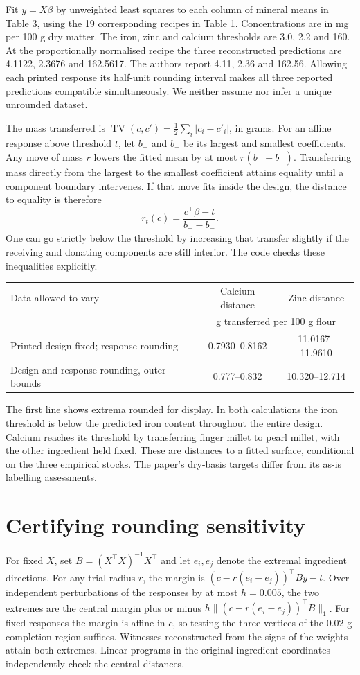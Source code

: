\documentclass[11pt]{article}
\newcommand{\TV}{\operatorname{TV}}
\begin{document}
Fit $y=X\beta$ by unweighted least squares to each column of mineral means in Table 3, using the 19 corresponding recipes in Table 1. Concentrations are in mg per 100 g dry matter. The iron, zinc and calcium thresholds are 3.0, 2.2 and 160. At the proportionally normalised recipe the three reconstructed predictions are 4.1122, 2.3676 and 162.5617. The authors report 4.11, 2.36 and 162.56. Allowing each printed response its half-unit rounding interval makes all three reported predictions compatible simultaneously. We neither assume nor infer a unique unrounded dataset.

The mass transferred is $\TV(c,c')=\tfrac12\sum_i |c_i-c'_i|$, in grams. For an affine response above threshold $t$, let $b_+$ and $b_-$ be its largest and smallest coefficients. Any move of mass $r$ lowers the fitted mean by at most $r(b_+-b_-)$. Transferring mass directly from the largest to the smallest coefficient attains equality until a component boundary intervenes. If that move fits inside the design, the distance to equality is therefore
\[
     r_t(c)=\frac{c^\top\beta-t}{b_+-b_-}.
\]
One can go strictly below the threshold by increasing that transfer slightly if the receiving and donating components are still interior. The code checks these inequalities explicitly.

\begin{center}
\begin{tabular}{lcc}\toprule
Data allowed to vary & Calcium distance & Zinc distance\\
 & \multicolumn{2}{c}{g transferred per 100 g flour}\\\midrule
Printed design fixed; response rounding & 0.7930--0.8162 & 11.0167--11.9610\\
Design and response rounding, outer bounds & 0.777--0.832 & 10.320--12.714\\\bottomrule
\end{tabular}
\end{center}
The first line shows extrema rounded for display. In both calculations the iron threshold is below the predicted iron content throughout the entire design. Calcium reaches its threshold by transferring finger millet to pearl millet, with the other ingredient held fixed. These are distances to a fitted surface, conditional on the three empirical stocks. The paper's dry-basis targets differ from its as-is labelling assessments.

\section{Certifying rounding sensitivity}
For fixed $X$, set $B=(X^\top X)^{-1}X^\top$ and let $e_i,e_j$ denote the extremal ingredient directions. For any trial radius $r$, the margin is $(c-r(e_i-e_j))^\top By-t$. Over independent perturbations of the responses by at most $h=0.005$, the two extremes are the central margin plus or minus $h\|(c-r(e_i-e_j))^\top B\|_1$. For fixed responses the margin is affine in $c$, so testing the three vertices of the 0.02 g completion region suffices. Witnesses reconstructed from the signs of the weights attain both extremes. Linear programs in the original ingredient coordinates independently check the central distances.
\end{document}
